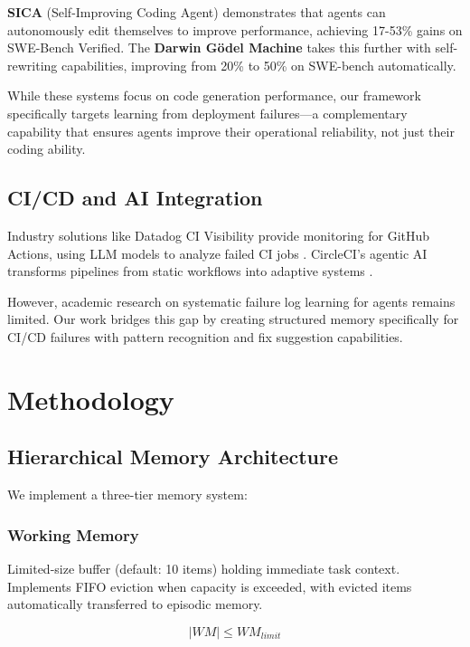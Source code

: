 \documentclass{article}
\begin{document}
\textbf{SICA} (Self-Improving Coding Agent) \cite{sica2025} demonstrates that agents can autonomously edit themselves to improve performance, achieving 17-53\% gains on SWE-Bench Verified. The \textbf{Darwin Gödel Machine} \cite{dgm2025} takes this further with self-rewriting capabilities, improving from 20\% to 50\% on SWE-bench automatically.

While these systems focus on code generation performance, our framework specifically targets learning from deployment failures—a complementary capability that ensures agents improve their operational reliability, not just their coding ability.

\subsection{CI/CD and AI Integration}

Industry solutions like Datadog CI Visibility provide monitoring for GitHub Actions, using LLM models to analyze failed CI jobs \cite{datadog2025}. CircleCI's agentic AI transforms pipelines from static workflows into adaptive systems \cite{circleci2025}.

However, academic research on systematic failure log learning for agents remains limited. Our work bridges this gap by creating structured memory specifically for CI/CD failures with pattern recognition and fix suggestion capabilities.

\section{Methodology}

\subsection{Hierarchical Memory Architecture}

We implement a three-tier memory system:

\subsubsection{Working Memory}
Limited-size buffer (default: 10 items) holding immediate task context. Implements FIFO eviction when capacity is exceeded, with evicted items automatically transferred to episodic memory.

\begin{equation}
    |WM| \leq WM_{limit}
\end{equation}
\end{document}
